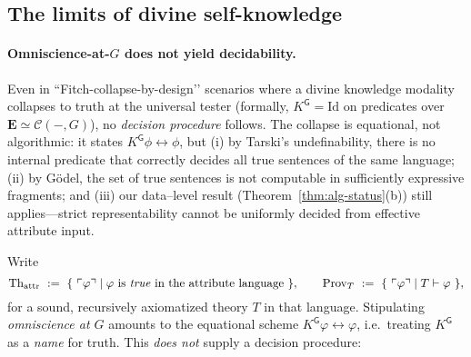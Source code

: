 \documentclass[11pt]{article}
\theoremstyle{upright}
\begin{document}
\subsection{The limits of divine self-knowledge}
\paragraph{Omniscience-at-$G$ does not yield decidability.}
Even in “Fitch-collapse-by-design’’ scenarios where a divine knowledge modality collapses to truth at the universal tester (formally, $K^{\mathsf G}=\mathrm{Id}$ on predicates over $\mathbf E\simeq\mathcal C(-,G)$), no \emph{decision procedure} follows. The collapse is equational, not algorithmic: it states $K^{\mathsf G}\phi\leftrightarrow \phi$, but (i) by Tarski’s undefinability, there is no internal predicate that correctly decides all true sentences of the same language; (ii) by Gödel, the set of true sentences is not computable in sufficiently expressive fragments; and (iii) our data–level result (Theorem~\ref{thm:alg-status}(b)) still applies—strict representability cannot be uniformly decided from effective attribute input. 

\medskip
\noindent{}Write
\[
\mathrm{Th}_{\mathrm{attr}}\ :=\ \{\ \ulcorner\varphi\urcorner\mid \text{$\varphi$ is \emph{true} in the attribute language}\ \},
\qquad
\mathrm{Prov}_T\ :=\ \{\ \ulcorner\varphi\urcorner\mid T\vdash \varphi\ \},
\]
for a sound, recursively axiomatized theory $T$ in that language. Stipulating \emph{omniscience at $G$} amounts to the equational scheme
$K^{\mathsf G}\varphi \leftrightarrow \varphi$, i.e.\ treating $K^{\mathsf G}$ as a \emph{name} for truth. This \emph{does not} supply a decision procedure:
\end{document}
